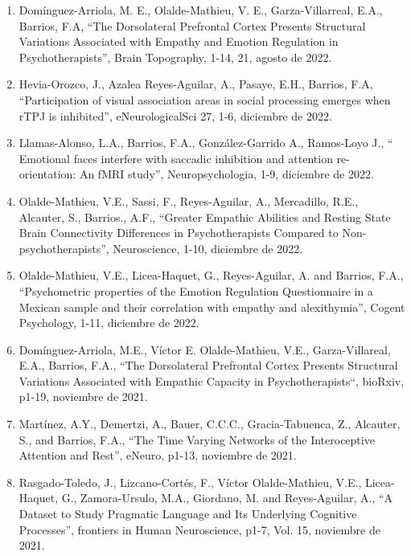 \begin{enumerate}
\item Domínguez-Arriola, M. E., Olalde-Mathieu, V. E., Garza-Villarreal, E.A., Barrios, F.A, “The Dorsolateral Prefrontal 
Cortex Presents Structural Variations Associated with Empathy and Emotion Regulation in Psychotherapists”, Brain Topography, 
1-14, 21,    agosto de 2022.

\item Hevia-Orozco, J., Azalea Reyes-Aguilar, A., Pasaye, E.H., Barrios, F.A, “Participation of visual association areas in 
social processing emerges when rTPJ is inhibited”, eNeurologicalSci 27, 1-6,    diciembre 
de 2022.

\item Llamas-Alonso, L.A., Barrios, F.A., González-Garrido A., Ramos-Loyo J., “ Emotional faces interfere with saccadic 
inhibition and attention re-orientation: An fMRI study”, Neuropsychologia, 1-9,    
diciembre de 2022.

\item Olalde-Mathieu, V.E., Sassi, F., Reyes-Aguilar, A., Mercadillo, R.E., Alcauter, S., Barrios., A.F., “Greater Empathic 
Abilities and Resting State Brain Connectivity Differences in Psychotherapists Compared to Non-psychotherapists”, 
Neuroscience, 1-10,    diciembre de 2022.

\item Olalde-Mathieu, V.E., Licea-Haquet, G., Reyes-Aguilar, A. and Barrios, F.A., “Psychometric properties of the Emotion 
Regulation Questionnaire in a Mexican sample and their correlation with empathy and alexithymia”, Cogent Psychology, 1-11, 
   diciembre de 2022.

\item Domínguez-Arriola, M.E., Víctor E. Olalde-Mathieu, V.E., Garza-Villareal, E.A., Barrios, F.A., “The Dorsolateral 
Prefrontal Cortex Presents Structural Variations Associated with Empathic Capacity in Psychotherapists“, bioRxiv, p1-19, 
   noviembre de 2021.

\item Martínez, A.Y., Demertzi, A., Bauer, C.C.C., Gracia-Tabuenca, Z., Alcauter, S., and Barrios, F.A., “The Time Varying 
Networks of the Interoceptive Attention and Rest”, eNeuro, p1-13,    noviembre de 2021.

\item Rasgado-Toledo, J., Lizcano-Cortés, F., Víctor Olalde-Mathieu, V.E., Licea-Haquet, G., Zamora-Ursulo, M.A., Giordano, 
M. and Reyes-Aguilar, A., “A Dataset to Study Pragmatic Language and Its Underlying Cognitive Processes”, frontiers in Human 
Neuroscience, p1-7, Vol. 15,    noviembre de 2021.


\end{enumerate}
